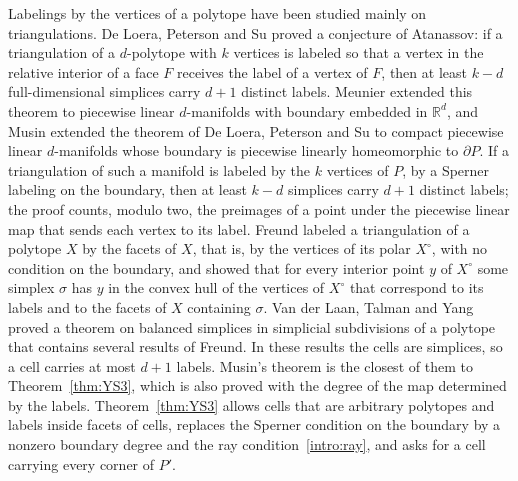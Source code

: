 \documentclass[11pt]{amsart}
\theoremstyle{definition}
\theoremstyle{remark}
\numberwithin{equation}{section}
\begin{document}
Labelings by the vertices of a polytope have been studied mainly on triangulations. De Loera, Peterson and Su \cite{DLPS02} proved a conjecture of Atanassov: if a triangulation of a $d$-polytope with $k$ vertices is labeled so that a vertex in the relative interior of a face $F$ receives the label of a vertex of $F$, then at least $k-d$ full-dimensional simplices carry $d+1$ distinct labels. Meunier \cite{Meu06} extended this theorem to piecewise linear $d$-manifolds with boundary embedded in $\mathbb{R}^d$, and Musin \cite{Musin15} extended the theorem of De Loera, Peterson and Su to compact piecewise linear $d$-manifolds whose boundary is piecewise linearly homeomorphic to $\partial P$. If a triangulation of such a manifold is labeled by the $k$ vertices of $P$, by a Sperner labeling on the boundary, then at least $k-d$ simplices carry $d+1$ distinct labels; the proof counts, modulo two, the preimages of a point under the piecewise linear map that sends each vertex to its label. Freund \cite{Fre89} labeled a triangulation of a polytope $X$ by the facets of $X$, that is, by the vertices of its polar $X^\circ$, with no condition on the boundary, and showed that for every interior point $y$ of $X^\circ$ some simplex $\sigma$ has $y$ in the convex hull of the vertices of $X^\circ$ that correspond to its labels and to the facets of $X$ containing $\sigma$. Van der Laan, Talman and Yang \cite{LTY01} proved a theorem on balanced simplices in simplicial subdivisions of a polytope that contains several results of Freund. In these results the cells are simplices, so a cell carries at most $d+1$ labels. Musin's theorem is the closest of them to Theorem~\ref{thm:YS3}, which is also proved with the degree of the map determined by the labels. Theorem~\ref{thm:YS3} allows cells that are arbitrary polytopes and labels inside facets of cells, replaces the Sperner condition on the boundary by a nonzero boundary degree and the ray condition~\eqref{intro:ray}, and asks for a cell carrying every corner of $P'$.
\end{document}
